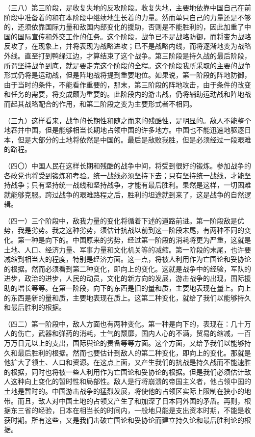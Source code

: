 （三八）第三阶段，是收复失地的反攻阶段。收复失地，主要地依靠中国自己在前阶段中准备着的和在本阶段中继续地生长着的力量。然而单只自己的力量还是不够的，还须依靠国际力量和敌国内部变化的援助，否则是不能胜利的，因此加重了中国的国际宣传和外交工作的任务。这个阶段，战争已不是战略防御，而将变为战略反攻了，在现象上，并将表现为战略进攻；已不是战略内线，而将逐渐地变为战略外线。直至打到鸭绿江边，才算结束了这个战争。第三阶段是持久战的最后阶段，所谓坚持战争到底，就是要走完这个阶段的全程。这个阶段我所采取的主要的战争形式仍将是运动战，但是阵地战将提到重要地位。如果说，第一阶段的阵地防御，由于当时的条件，不能看作重要的，那末，第三阶段的阵地攻击，由于条件的改变和任务的需要，将变成颇为重要的。此阶段内的游击战，仍将辅助运动战和阵地战而起其战略配合的作用，和第二阶段之变为主要形式者不相同。

（三九）这样看来，战争的长期性和随之而来的残酷性，是明显的。敌人不能整个地吞并中国，但是能够相当长期地占领中国的许多地方。中国也不能迅速地驱逐日本，但是大部分的土地将依然是中国的。最后是敌败我胜，但是必须经过一段艰难的路程。

（四〇）中国人民在这样长期和残酷的战争中间，将受到很好的锻炼。参加战争的各政党也将受到锻炼和考验。统一战线必须坚持下去；只有坚持统一战线，才能坚持战争；只有坚持统一战线和坚持战争，才能有最后胜利。果然是这样，一切困难就能够克服。跨过战争的艰难路程之后，胜利的坦途就到来了，这是战争的自然逻辑。

（四一）三个阶段中，敌我力量的变化将循着下述的道路前进。第一阶段敌是优势，我是劣势。我之这种劣势，须估计抗战以前到这一阶段末尾，有两种不同的变化。第一种是向下的。中国原来的劣势，经过第一阶段的消耗将更为严重，这就是土地、人口、经济力量、军事力量和文化机关等的减缩。第一阶段的末尾，也许要减缩到相当大的程度，特别是经济方面。这一点，将被人利用作为亡国论和妥协论的根据。然而必须看到第二种变化，即向上的变化。这就是战争中的经验，军队的进步，政治的进步，人民的动员，文化的新方向的发展，游击战争的出现，国际援助的增长等等。在第一阶段，向下的东西是旧的量和质，主要地表现在量上。向上的东西是新的量和质，主要地表现在质上。这第二种变化，就给了我们以能够持久和最后胜利的根据。

（四二）第一阶段中，敌人方面也有两种变化。第一种是向下的，表现在：几十万人的伤亡，武器和弹药的消耗，士气的颓靡，国内人心的不满，贸易的缩减，一百万万日元以上的支出，国际舆论的责备等等方面。这个方面，又给予我们以能够持久和最后胜利的根据。然而也要估计到敌人的第二种变化，即向上的变化。那就是他扩大了领土、人口和资源。在这点上面，又产生我们的抗战是持久战而不能速胜的根据，同时也将被一些人利用作为亡国论和妥协论的根据。但是我们必须估计敌人这种向上变化的暂时性和局部性。敌人是行将崩溃的帝国主义者，他占领中国的土地是暂时的。中国游击战争的猛烈发展，将使他的占领区实际上限制在狭小的地带。而且，敌人对中国土地的占领又产生了和加深了日本同外国的矛盾。再则，根据东三省的经验，日本在相当长的时间内，一般地只能是支出资本时期，不能是收获时期。所有这些，又是我们击破亡国论和妥协论而建立持久论和最后胜利论的根据。


